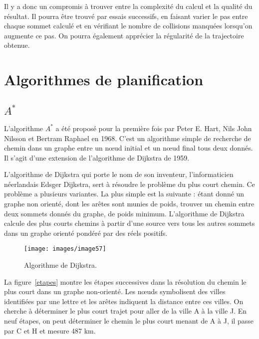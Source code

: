 \documentclass{article}
\begin{document}
Il y a donc un compromis à trouver entre la complexité du calcul et la qualité du résultat. Il pourra être trouvé par essais successifs, en faisant varier le pas entre chaque sommet calculé et en vérifiant le nombre de collisions manquées lorsqu’on augmente ce pas. On pourra également apprécier la régularité de la trajectoire obtenue.

\section{Algorithmes de planification}
\subsection{$A^*$}
L’algorithme $A^*$ a été proposé pour la première fois par Peter E. Hart, Nils John Nilsson et Bertram Raphael en 1968. C’est un algorithme simple de recherche de chemin dans un graphe entre un nœud initial et un nœud final tous deux donnés. Il s'agit d'une extension de l'algorithme de Dijkstra de 1959. 

L’algorithme de Dijkstra qui porte le nom de son inventeur, l'informaticien néerlandais Edsger Dijkstra, sert à résoudre le problème du plus court chemin. Ce problème a plusieurs variantes. La plus simple est la suivante : étant donné un graphe non orienté, dont les arêtes sont munies de poids, trouver un chemin entre deux sommets donnés du graphe, de poids minimum. L'algorithme de Dijkstra calcule des plus courts chemins à partir d'une source vers tous les autres sommets dans un graphe orienté pondéré par des réels positifs. 

\begin{figure}[h]
  \centering
  \texttt{[image: images/image57]}
  \caption{Algorithme de Dijkstra.}
\end{figure}

La figure~\ref{etapes} montre les étapes successives dans la résolution du chemin le plus court dans un graphe non-orienté. Les nœuds symbolisent des villes identifiées par une lettre et les arêtes indiquent la distance entre ces villes. On cherche à déterminer le plus court trajet pour aller de la ville A à la ville J. En neuf étapes, on peut déterminer le chemin le plus court menant de A à J, il passe par C et H et mesure 487 km.
\end{document}
